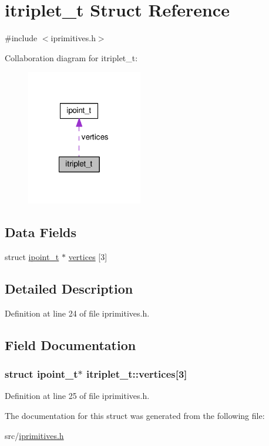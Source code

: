 \hypertarget{structitriplet__t}{\section{itriplet\-\_\-t Struct Reference}
\label{structitriplet__t}
}


{\ttfamily \#include $<$iprimitives.\-h$>$}



Collaboration diagram for itriplet\-\_\-t\-:\nopagebreak
\begin{figure}[H]
\begin{center}
\leavevmode
\includegraphics[width=143pt]{structitriplet__t__coll__graph}
\end{center}
\end{figure}
\subsection*{Data Fields}
\begin{DoxyCompactItemize}
\item 
struct \hyperlink{structipoint__t}{ipoint\-\_\-t} $\ast$ \hyperlink{structitriplet__t_a93f85fc4e829ca4d42b67173839af2c3}{vertices} \mbox{[}3\mbox{]}
\end{DoxyCompactItemize}


\subsection{Detailed Description}


Definition at line 24 of file iprimitives.\-h.



\subsection{Field Documentation}
\hypertarget{structitriplet__t_a93f85fc4e829ca4d42b67173839af2c3}{
\subsubsection[{vertices}]{\setlength{\rightskip}{0pt plus 5cm}struct {\bf ipoint\-\_\-t}$\ast$ itriplet\-\_\-t\-::vertices\mbox{[}3\mbox{]}}}\label{structitriplet__t_a93f85fc4e829ca4d42b67173839af2c3}


Definition at line 25 of file iprimitives.\-h.



The documentation for this struct was generated from the following file\-:\begin{DoxyCompactItemize}
\item 
src/\hyperlink{iprimitives_8h}{iprimitives.\-h}\end{DoxyCompactItemize}
